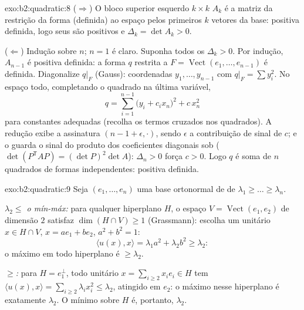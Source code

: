 \begin{solution}{exo:b2:quadratic:8}
($\Rightarrow$) O bloco superior esquerdo $k \times k$ $A_k$ é a matriz
da restrição da forma (definida) ao espaço  pelos primeiros
$k$ vetores da base: positiva definida, logo seus  são
positivos e $\Delta_k = \det A_k > 0$.

($\Leftarrow$) Indução sobre $n$; $n = 1$ é claro. Suponha todos os
$\Delta_k > 0$. Por indução, $A_{n-1}$ é positiva definida: a
forma $q$ restrita a $F = \operatorname{Vect}(e_1, \dots,
e_{n-1})$ é definida. Diagonalize $q|_F$ (Gauss): coordenadas
$y_1, \dots, y_{n-1}$ com $q|_F = \sum y_i^2$. No espaço todo,
completando o quadrado na última variável,
\[
q = \sum_{i=1}^{n-1} \bigl(y_i + c_i x_n\bigr)^2 + c\,x_n^2
\]
para constantes adequadas (recolha os termos cruzados nos quadrados).
A redução exibe a assinatura $(n-1 + \epsilon, \cdot)$, sendo
$\epsilon$ a contribuição de sinal de $c$; e o  guarda
o sinal do produto dos coeficientes diagonais sob
 ($\det(P^{\mathsf T}AP) = (\det P)^2\det A$): $\Delta_n
> 0$ força $c > 0$. Logo $q$ é soma de $n$ quadrados de
formas independentes: positiva definida.
\end{solution}

\begin{solution}{exo:b2:quadratic:9}
Seja $(e_1, \dots, e_n)$ uma base ortonormal de  de $\lambda_1
\geq \dots \geq \lambda_n$.

\emph{$\lambda_2 \leq$ o mín-máx:} para qualquer hiperplano $H$, o
espaço $V = \operatorname{Vect}(e_1, e_2)$ de dimensão $2$ satisfaz
$\dim(H \cap V) \geq 1$ (Grassmann): escolha um unitário $x \in H \cap V$,
$x = ae_1 + be_2$, $a^2 + b^2 = 1$:
\[
\langle u(x), x\rangle = \lambda_1 a^2 + \lambda_2 b^2 \geq
\lambda_2 :
\]
o máximo em todo hiperplano é $\geq \lambda_2$.

\emph{$\geq$:} para $H = e_1^{\perp}$, todo unitário $x = \sum_{i\geq2}
x_ie_i \in H$ tem $\langle u(x), x\rangle = \sum_{i \geq 2}
\lambda_i x_i^2 \leq \lambda_2$, atingido em $e_2$: o máximo
nesse hiperplano é exatamente $\lambda_2$. O mínimo sobre $H$ é,
portanto, $\lambda_2$.
\end{solution}


